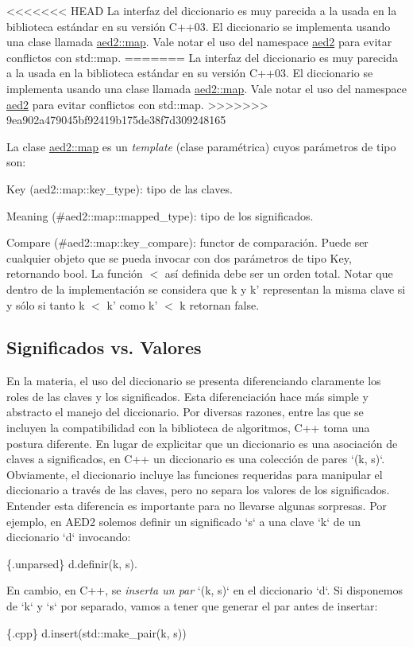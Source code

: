 <<<<<<< HEAD
\-La interfaz del diccionario es muy parecida a la usada en la biblioteca estándar en su versión \-C++03. \-El diccionario se implementa usando una clase llamada \hyperlink{classaed2_1_1map}{aed2\-::map}. \-Vale notar el uso del namespace \hyperlink{namespaceaed2}{aed2} para evitar conflictos con std\-::map.
=======
La interfaz del diccionario es muy parecida a la usada en la biblioteca estándar en su versión C++03. El diccionario se implementa usando una clase llamada \hyperlink{classaed2_1_1map}{aed2\+::map}. Vale notar el uso del namespace \hyperlink{namespaceaed2}{aed2} para evitar conflictos con std\+::map.
>>>>>>> 9ea902a479045bf92419b175de38f7d309248165

\-La clase \hyperlink{classaed2_1_1map}{aed2\-::map} es un {\itshape template\/} (clase paramétrica) cuyos parámetros de tipo son\-:
\begin{DoxyItemize}
\item \-Key (aed2\-::map\-::key\-\_\-type)\-: tipo de las claves.
\item \-Meaning (\#aed2\-::map\-::mapped\-\_\-type)\-: tipo de los significados.
\item \-Compare (\#aed2\-::map\-::key\-\_\-compare)\-: functor de comparación. \-Puede ser cualquier objeto que se pueda invocar con dos parámetros de tipo \-Key, retornando {\ttfamily bool}. \-La función $<$ así definida debe ser un orden total. \-Notar que dentro de la implementación se considera que {\ttfamily k} y {\ttfamily k'} representan la misma clave si y sólo si tanto {\ttfamily k} $<$ {\ttfamily k'} como {\ttfamily k'} $<$ {\ttfamily k} retornan {\ttfamily false}.
\end{DoxyItemize}\hypertarget{Interfaz_Diferencias}{}\subsection{\-Significados vs. Valores}\label{Interfaz_Diferencias}
\-En la materia, el uso del diccionario se presenta diferenciando claramente los roles de las claves y los significados. \-Esta diferenciación hace más simple y abstracto el manejo del diccionario. \-Por diversas razones, entre las que se incluyen la compatibilidad con la biblioteca de algoritmos, \-C++ toma una postura diferente. \-En lugar de explicitar que un diccionario es una asociación de claves a significados, en \-C++ un diccionario es una colección de pares `(k, s)`. \-Obviamente, el diccionario incluye las funciones requeridas para manipular el diccionario a través de las claves, pero no separa los valores de los significados. \-Entender esta diferencia es importante para no llevarse algunas sorpresas. \-Por ejemplo, en \-A\-E\-D2 solemos definir un significado `s` a una clave `k` de un diccionario `d` invocando\-: 
\begin{DoxyCode}
 \{.unparsed\}
 d.definir(k, s).
\end{DoxyCode}
 \-En cambio, en \-C++, se {\itshape inserta un par\/} `(k, s)` en el diccionario `d`. \-Si disponemos de `k` y `s` por separado, vamos a tener que generar el par antes de insertar\-: 
\begin{DoxyCode}
 \{.cpp\}
 d.insert(std::make\_pair(k, s))
\end{DoxyCode}


